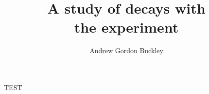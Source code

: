 \documentclass{mythesis}
\title{A study of \BToKPi decays with\\ the \LHCb experiment}
\author{Andrew Gordon Buckley}
\begin{document}
\begin{frontmatter}
  
\end{frontmatter}
TEST
\begin{mainmatter}
  
  
  
  
  

\end{mainmatter}

\begin{appendices}
  
\end{appendices}

\begin{backmatter}
  
\end{backmatter}

\end{document}
